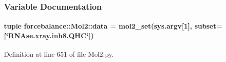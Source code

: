 \subsubsection{\-Variable \-Documentation}
\hypertarget{namespaceforcebalance_1_1Mol2_a41537283c77bf1c8e05a63667003ae1c}{
\paragraph[{data}]{\setlength{\rightskip}{0pt plus 5cm}tuple {\bf forcebalance\-::\-Mol2\-::data} = {\bf mol2\-\_\-set}(sys.\-argv\mbox{[}1\mbox{]}, subset=\mbox{[}\char`\"{}\-R\-N\-Ase.\-xray.\-inh8.\-Q\-H\-C\char`\"{}\mbox{]})}}\label{namespaceforcebalance_1_1Mol2_a41537283c77bf1c8e05a63667003ae1c}


\-Definition at line 651 of file \-Mol2.\-py.


